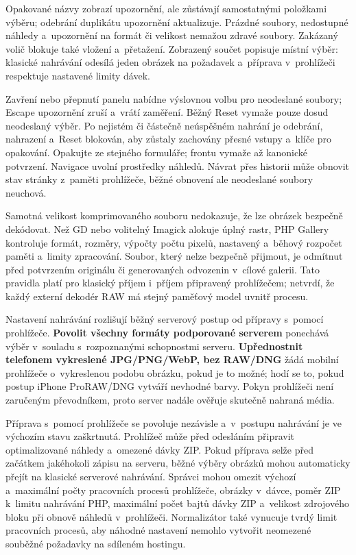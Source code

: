 \documentclass[11pt,a4paper]{article}
\newcommand{\ui}[1]{\textbf{#1}}
\begin{document}
Opakované názvy zobrazí upozornění, ale zůstávají samostatnými položkami výběru;
odebrání duplikátu upozornění aktualizuje. Prázdné soubory, nedostupné náhledy
a~upozornění na formát či velikost nemažou zdravé soubory. Zakázaný volič
blokuje také vložení a~přetažení. Zobrazený součet popisuje místní výběr:
klasické nahrávání odesílá jeden obrázek na požadavek a~příprava v~prohlížeči
respektuje nastavené limity dávek.

Zavření nebo přepnutí panelu nabídne výslovnou volbu pro neodeslané soubory;
Escape upozornění zruší a~vrátí zaměření. Běžný Reset vymaže pouze dosud
neodeslaný výběr. Po nejistém či částečně neúspěšném nahrání je odebrání,
nahrazení a~Reset blokován, aby zůstaly zachovány přesné vstupy a~klíče pro
opakování. Opakujte ze stejného formuláře; frontu vymaže až kanonické potvrzení.
Navigace uvolní prostředky náhledů. Návrat přes historii může obnovit stav
stránky z~paměti prohlížeče, běžné obnovení ale neodeslané soubory neuchová.

Samotná velikost komprimovaného souboru nedokazuje, že lze obrázek bezpečně
dekódovat. Než GD nebo volitelný Imagick alokuje úplný rastr, PHP Gallery
kontroluje formát, rozměry, výpočty počtu pixelů, nastavený a~běhový rozpočet
paměti a~limity zpracování. Soubor, který nelze bezpečně přijmout, je odmítnut
před potvrzením originálu či generovaných odvozenin v~cílové galerii. Tato
pravidla platí pro klasický příjem i~příjem připravený prohlížečem; netvrdí, že
každý externí dekodér RAW má stejný paměťový model uvnitř procesu.

Nastavení nahrávání rozlišují běžný serverový postup od přípravy s~pomocí
prohlížeče. \ui{Povolit všechny formáty podporované serverem} ponechává výběr
v~souladu s~rozpoznanými schopnostmi serveru. \ui{Upřednostnit telefonem
vykreslené JPG/PNG/WebP, bez RAW/DNG} žádá mobilní prohlížeče o~vykreslenou
podobu obrázku, pokud je to možné; hodí se to, pokud postup iPhone ProRAW/DNG
vytváří nevhodné barvy. Pokyn prohlížeči není zaručeným převodníkem, proto
server nadále ověřuje skutečně nahraná média.

Příprava s~pomocí prohlížeče se povoluje nezávisle a~v~postupu nahrávání je ve
výchozím stavu zaškrtnutá. Prohlížeč může před odesláním připravit
optimalizované náhledy a~omezené dávky ZIP. Pokud příprava selže před začátkem
jakéhokoli zápisu na serveru, běžné výběry obrázků mohou automaticky přejít na
klasické serverové nahrávání. Správci mohou omezit výchozí a~maximální počty
pracovních procesů prohlížeče, obrázky v~dávce, poměr ZIP k~limitu nahrávání
PHP, maximální počet bajtů dávky ZIP a~velikost zdrojového bloku při obnově
náhledů v~prohlížeči. Normalizátor také vynucuje tvrdý limit pracovních procesů,
aby náhodné nastavení nemohlo vytvořit neomezené souběžné požadavky na sdíleném
hostingu.
\end{document}
